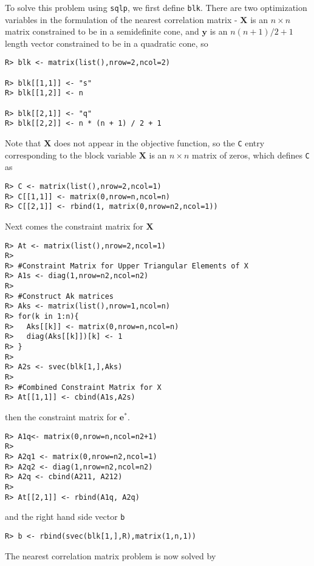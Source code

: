 \documentclass{article}
\newcommand{\ve}[1]{\mathbf{#1}}           %
\newcommand{\m}[1]{\mathbf{#1}}               %
\begin{document}
To solve this problem using \verb!sqlp!, we first define \verb!blk!. There are two optimization variables in the formulation of the nearest correlation matrix - $\m{X}$ is an $n \times n$ matrix constrained to be in a semidefinite cone, and $\ve{y}$ is an $n(n+1)/2 + 1$ length vector constrained to be in a quadratic cone, so 

\begin{verbatim}
R> blk <- matrix(list(),nrow=2,ncol=2)

R> blk[[1,1]] <- "s"
R> blk[[1,2]] <- n

R> blk[[2,1]] <- "q"
R> blk[[2,2]] <- n * (n + 1) / 2 + 1
\end{verbatim}

Note that $\m{X}$ does not appear in the objective function, so the \verb!C! entry corresponding to the block variable $\m{X}$ is an $n \times n$ matrix of zeros, which defines \verb!C! as

\begin{verbatim}
R> C <- matrix(list(),nrow=2,ncol=1)
R> C[[1,1]] <- matrix(0,nrow=n,ncol=n)
R> C[[2,1]] <- rbind(1, matrix(0,nrow=n2,ncol=1))
\end{verbatim}

Next comes the constraint matrix for $\m{X}$

\begin{verbatim}
R> At <- matrix(list(),nrow=2,ncol=1)
R>
R> #Constraint Matrix for Upper Triangular Elements of X
R> A1s <- diag(1,nrow=n2,ncol=n2)
R>
R> #Construct Ak matrices
R> Aks <- matrix(list(),nrow=1,ncol=n)
R> for(k in 1:n){
R>   Aks[[k]] <- matrix(0,nrow=n,ncol=n)
R>   diag(Aks[[k]])[k] <- 1
R> }
R>
R> A2s <- svec(blk[1,],Aks)
R> 
R> #Combined Constraint Matrix for X
R> At[[1,1]] <- cbind(A1s,A2s)
\end{verbatim}

\noindent then the constraint matrix for $\ve{e}^{\ast}$.

\begin{verbatim}
R> A1q<- matrix(0,nrow=n,ncol=n2+1)
R>
R> A2q1 <- matrix(0,nrow=n2,ncol=1)
R> A2q2 <- diag(1,nrow=n2,ncol=n2)
R> A2q <- cbind(A211, A212)
R>
R> At[[2,1]] <- rbind(A1q, A2q)
\end{verbatim}

\noindent and the right hand side vector \verb!b!

\begin{verbatim}
R> b <- rbind(svec(blk[1,],R),matrix(1,n,1))
\end{verbatim}

The nearest correlation matrix problem is now solved by
\end{document}

